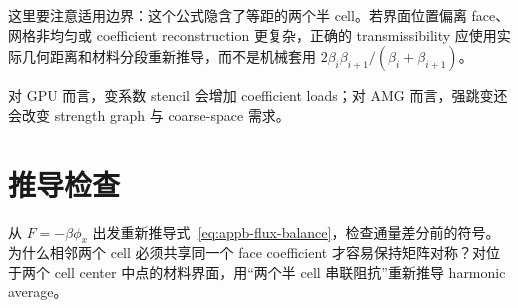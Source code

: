 这里要注意适用边界：这个公式隐含了等距的两个半 cell。若界面位置偏离 face、网格非均匀或 coefficient reconstruction 更复杂，正确的 transmissibility 应使用实际几何距离和材料分段重新推导，而不是机械套用 $2\beta_i\beta_{i+1}/(\beta_i+\beta_{i+1})$。

对 GPU 而言，变系数 stencil 会增加 coefficient loads；对 AMG 而言，强跳变还会改变 strength graph 与 coarse-space 需求。

\section*{推导检查}
\begin{checkpointbox}
从 $F=-\beta\phi_x$ 出发重新推导式~\eqref{eq:appb-flux-balance}，检查通量差分前的符号。为什么相邻两个 cell 必须共享同一个 face coefficient 才容易保持矩阵对称？对位于两个 cell center 中点的材料界面，用“两个半 cell 串联阻抗”重新推导 harmonic average。
\end{checkpointbox}
